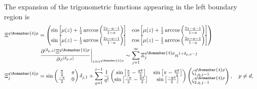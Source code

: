\documentclass[11pt]{article}
\newcommand*{\todo}[1]{{\color{red}?? TODO: #1 ??}}
\newcommand{\qg}{q}
\newcommand{\ql}{L}
\newcommand{\rg}{r}
\newcommand{\rl}{{\scriptsize \Romanbar{4}} }
\newcommand{\pg}{p}
\newcommand{\pd}{d}
\numberwithin{equation}{section}
\begin{document}
The expansion of the trigonometric functions appearing in the left boundary region is
\begin{align} %
	\Xi^{\qg\rl\pg} & = \begin{pmatrix} \sin\left[ \mu(z) + \frac{1}{2} \arccos\left(\frac{2z -a-1}{1-a} \right) \right] &  \cos\left[ \mu(z) + \frac{1}{2} \arccos\left(\frac{2z -a-1}{1-a} \right) \right] \\ \sin\left[ \mu(z) - \frac{1}{2} \arccos\left(\frac{2z -a-1}{1-a} \right) \right] &  \cos\left[ \mu(z) - \frac{1}{2} \arccos\left(\frac{2z -a-1}{1-a} \right) \right] \end{pmatrix} \\ 
	& \left.\frac{\partial^{(\delta_{\pg,\pd})} \Xi^{\qg\rl\pg} }{\partial z^{(\delta_{\pg,\pd})}}\right|_{z=z^{\qg\rl\pg}} \sim \sum_{j=1}^\infty \Xi_j^{\qg\rl\pg} n^{1+ \delta_{\pg,\pd} -j} \\
	\Xi_j^{\qg\rl\pg} & = \sin\begin{pmatrix} \frac{\pi}{2} & \pi \\ \frac{-\pi}{2} & 0 \end{pmatrix} \delta_{j,1} + \sum_{q=1}^{j-1} \frac{1}{q!} \begin{pmatrix} \sin\left[\frac{\pi}{2}-\frac{q\pi}{2}\right]  &  \sin\left[ \pi-\frac{q\pi}{2}\right] \\ \sin\left[\frac{-\pi}{2} -\frac{q\pi}{2}\right] &  \sin\left[\frac{-q\pi}{2}\right] \end{pmatrix} \begin{pmatrix} \zeta_{1,q,j-1}^{\qg\rl\pg} \\ \zeta_{2,q,j-1}^{\qg\rl\pg} \end{pmatrix}, \quad \pg \neq \pd, \\ %

\end{align}
\end{document}
